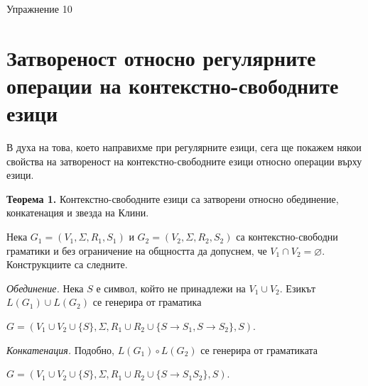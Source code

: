 \documentclass{article}
\begin{document}
\begin{center}
    {\huge Упражнение 10}
\end{center}

\vspace{15pt}

\section{Затвореност относно регулярните операции на контекстно-свободните езици}
    \hspace{15pt}В духа на това, което направихме при регулярните езици, сега ще покажем някои 
    свойства на затвореност на контекстно-свободните езици относно операции върху
    езици.

    \vspace{15pt}

    \textbf{Теорема 1.} Контекстно-свободните езици са затворени относно обединение,
    конкатенация и звезда на Клини. \\

    \vspace{15pt}

    \hspace{15pt} Нека $G_1 = (V_1,\Sigma,R_1,S_1)$ и $G_2 = (V_2,\Sigma,R_2,S_2)$ са контекстно-свободни
    граматики и без ограничение
    на общността да допуснем, че $V_1 \cap V_2 = \varnothing$. Конструкциите са 
    следните. \\
    
    \vspace{5pt}
    
    \hspace{15pt}\textit{Обединение.} Нека $S$ е символ, който не принадлежи на $V_1 \cup V_2$.
    Езикът $L(G_1) \cup L(G_2)$ се генерира от граматика 
    \begin{center}
    $G = (V_1 \cup V_2 \cup \{S\}, \Sigma,R_1 \cup R_2 \cup \{S \rightarrow S_1, S \rightarrow S_2\},S)$.
    \end{center}

    \vspace{5pt}

    \hspace{15pt}\textit{Конкатенация.} Подобно, $L(G_1) \circ L(G_2)$ се генерира от 
    граматиката 
    \begin{center}
        $G = (V_1 \cup V_2 \cup \{S\},\Sigma,R_1 \cup R_2 \cup \{S \rightarrow S_1S_2\},S)$. \\
    \end{center}    
\end{document}
